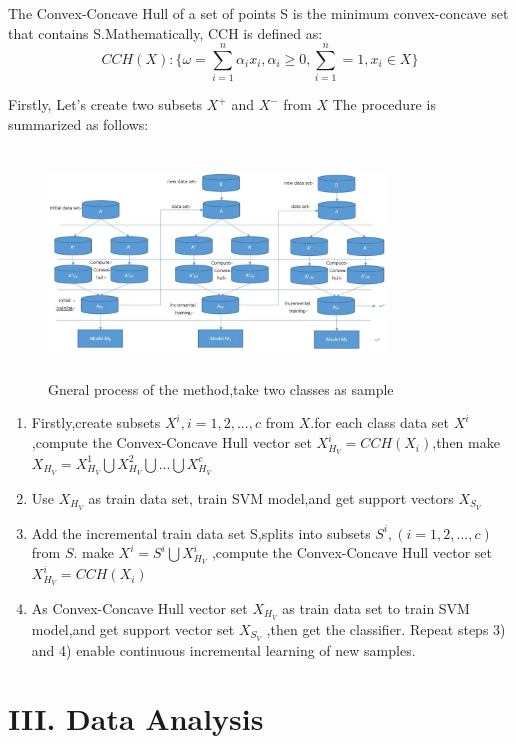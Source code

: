 \documentclass[a4paper]{article}
\begin{document}
The Convex-Concave Hull of a set of points S is the minimum convex-concave set that contains S.Mathematically, CCH is defined as:
$$
CCH(X) :\{ \omega = \sum_{i=1} ^{n} \alpha_i x_i, \alpha_i \geq 0, \sum_{i=1} ^{n} = 1, x_i \in X \}
$$

Firstly, Let's create two subsets $X^+$ and $X^-$ from $X$
The procedure is summarized as follows:
\begin{figure}[h]
  \centering
  \includegraphics[width=9cm,height=6cm]{算法示意图}
  \caption{Gneral process of the method,take two classes as sample}
\end{figure}

\begin{enumerate}
\item Firstly,create subsets $X^i, i= 1,2,...,c$ from $X$.for each class data set $X^{i}$ ,compute the Convex-Concave Hull vector set $X ^{i}_{H_{V}} = CCH(X_i)$,then make  $ X_{H_{V}} =X ^{1}_{H_{V}}  \bigcup X ^{2}_{H_{V}} \bigcup ...\bigcup X ^{c}_{H_{V}} $

\item Use $X_{H_{V}}$ as train data set, train SVM model,and get support vectors $X_{S_{V}}$

\item Add the incremental train data set S,splits into subsets $S^i ,( i= 1,2,...,c)$ from $S$.
make $X^i = S^i \bigcup X^i _{H_{V}}$ ,compute the Convex-Concave Hull vector set $X ^{i}_{H_{V}} = CCH(X_i)$

\item As Convex-Concave Hull vector set $X_{H_{V}}$ as train data set to train SVM model,and get support vector set $X_{S_{V}}$ ,then get the classifier.
Repeat steps 3) and 4) enable continuous incremental learning of new samples.
\end{enumerate}



\section{III. Data Analysis}
\end{document}
